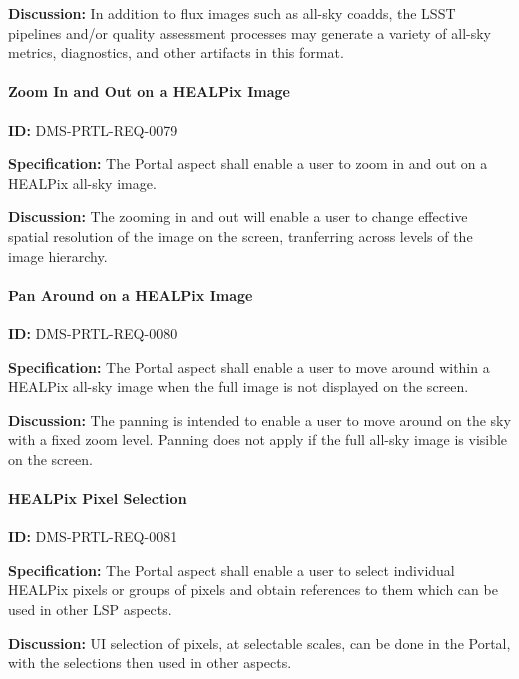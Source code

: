 \documentclass[SE,toc]{lsstdoc}
\begin{document}
\textbf{Discussion:}
In addition to flux images such as all-sky coadds, the LSST pipelines and/or quality assessment processes may generate a variety of all-sky metrics, diagnostics, and other artifacts in this format.

\paragraph{Zoom In and Out on a HEALPix Image}\hfill  %

\label{DMS-PRTL-REQ-0079}
\textbf{ID:} DMS-PRTL-REQ-0079

\textbf{Specification:}
The Portal aspect shall enable a user to zoom in and out on a HEALPix all-sky image.

\textbf{Discussion:}
The zooming in and out will enable a user to change effective spatial resolution of the image on the screen, tranferring across levels of the image hierarchy.

\paragraph{Pan Around on a HEALPix Image}\hfill  %

\label{DMS-PRTL-REQ-0080}
\textbf{ID:} DMS-PRTL-REQ-0080

\textbf{Specification:}
The Portal aspect shall enable a user to move around within a HEALPix all-sky image when the full image is not displayed on the screen.

\textbf{Discussion:}
The panning is intended to enable a user to move around on the sky with a fixed zoom level.  Panning does not apply if the full all-sky image is visible on the screen.

\paragraph{HEALPix Pixel Selection}\hfill  %

\label{DMS-PRTL-REQ-0081}
\textbf{ID:} DMS-PRTL-REQ-0081

\textbf{Specification:}
The Portal aspect shall enable a user to select individual HEALPix pixels or groups of pixels and obtain references to them which can be used in other LSP aspects.

\textbf{Discussion:}
UI selection of pixels, at selectable scales, can be done in the Portal, with the selections then used in other aspects.
\end{document}
